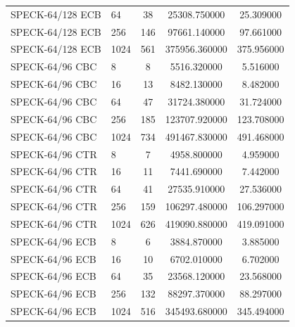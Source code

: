 \begin{table}
\begin{tabular}{@{}llccc@{}}
SPECK-64/128 ECB & 64 & 38 & 25308.750000 & 25.309000 \\
SPECK-64/128 ECB & 256 & 146 & 97661.140000 & 97.661000 \\
SPECK-64/128 ECB & 1024 & 561 & 375956.360000 & 375.956000 \\
SPECK-64/96 CBC & 8 & 8 & 5516.320000 & 5.516000 \\
SPECK-64/96 CBC & 16 & 13 & 8482.130000 & 8.482000 \\
SPECK-64/96 CBC & 64 & 47 & 31724.380000 & 31.724000 \\
SPECK-64/96 CBC & 256 & 185 & 123707.920000 & 123.708000 \\
SPECK-64/96 CBC & 1024 & 734 & 491467.830000 & 491.468000 \\
SPECK-64/96 CTR & 8 & 7 & 4958.800000 & 4.959000 \\
SPECK-64/96 CTR & 16 & 11 & 7441.690000 & 7.442000 \\
SPECK-64/96 CTR & 64 & 41 & 27535.910000 & 27.536000 \\
SPECK-64/96 CTR & 256 & 159 & 106297.480000 & 106.297000 \\
SPECK-64/96 CTR & 1024 & 626 & 419090.880000 & 419.091000 \\
SPECK-64/96 ECB & 8 & 6 & 3884.870000 & 3.885000 \\
SPECK-64/96 ECB & 16 & 10 & 6702.010000 & 6.702000 \\
SPECK-64/96 ECB & 64 & 35 & 23568.120000 & 23.568000 \\
SPECK-64/96 ECB & 256 & 132 & 88297.370000 & 88.297000 \\
SPECK-64/96 ECB & 1024 & 516 & 345493.680000 & 345.494000 \\
\bottomrule
\end{tabular}
\end{table}
